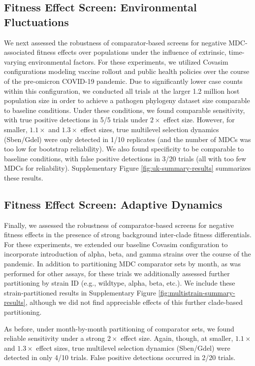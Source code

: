 \subsection{Fitness Effect Screen: Environmental Fluctuations}

We next assessed the robustness of comparator-based screens for negative MDC-associated fitness effects over populations under the influence of extrinsic, time-varying environmental factors.
For these experiments, we utilized Covasim configurations modeling vaccine rollout and public health policies over the course of the pre-omicron COVID-19 pandemic.
Due to significantly lower case counts within this configuration, we conducted all trials at the larger 1.2 million host population size in order to achieve a pathogen phylogeny dataset size comparable to baseline conditions.
Under these conditions, we found comparable sensitivity, with true positive detections in 5/5 trials under $2\times$ effect size.
However, for smaller, $1.1\times$ and $1.3\times$ effect sizes, true multilevel selection dynamics (Sben/Gdel) were only detected in 1/10 replicates (and the number of MDCs was too low for bootstrap reliability).
We also found specificity to be comparable to baseline conditions, with false positive detections in 3/20 trials (all with too few MDCs for reliability).
Supplementary Figure \ref{fig:uk-summary-results} summarizes these results.

\subsection{Fitness Effect Screen: Adaptive Dynamics}

Finally, we assessed the robustness of comparator-based screens for negative fitness effects in the presence of strong background inter-clade fitness differentials.
For these experiments, we extended our baseline Covasim configuration to incorporate introduction of alpha, beta, and gamma strains over the course of the pandemic.
In addition to partitioning MDC comparator sets by month, as was performed for other assays, for these trials we additionally assessed further partitioning by strain ID (e.g., wildtype, alpha, beta, etc.).
We include these strain-partitioned results in Supplementary Figure \ref{fig:multistrain-summary-results}, although we did not find appreciable effects of this further clade-based partitioning.

As before, under month-by-month partitioning of comparator sets, we found reliable sensitivity under a strong $2\times$ effect size.
Again, though, at smaller, $1.1\times$ and $1.3\times$ effect sizes, true multilevel selection dynamics (Sben/Gdel) were detected in only 4/10 trials.
False positive detections occurred in 2/20 trials.

